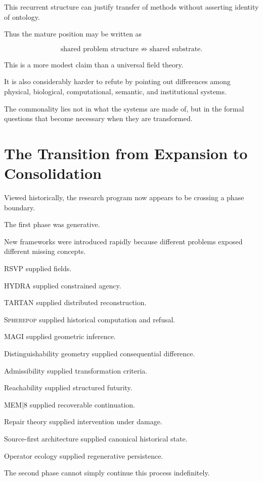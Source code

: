 \documentclass[11pt]{article}
\theoremstyle{remark}
\newcommand{\RSVP}{\textsc{RSVP}}
\newcommand{\HYDRA}{\textsc{HYDRA}}
\newcommand{\TARTAN}{\textsc{TARTAN}}
\newcommand{\MAGI}{\textsc{MAGI}}
\newcommand{\MEM}{\textsc{MEM|8}}
\newcommand{\Spherepop}{\textsc{Spherepop}}
\begin{document}
This recurrent structure can justify transfer of methods without asserting identity of ontology.

Thus the mature position may be written as

\begin{equation}
\boxed{
\text{shared problem structure}
\not\Rightarrow
\text{shared substrate}.
}
\end{equation}

This is a more modest claim than a universal field theory.

It is also considerably harder to refute by pointing out differences among physical, biological, computational, semantic, and institutional systems.

The commonality lies not in what the systems are made of, but in the formal questions that become necessary when they are transformed.

\section{The Transition from Expansion to Consolidation}

Viewed historically, the research program now appears to be crossing a phase boundary.

The first phase was generative.

New frameworks were introduced rapidly because different problems exposed different missing concepts.

\RSVP{} supplied fields.

\HYDRA{} supplied constrained agency.

\TARTAN{} supplied distributed reconstruction.

\Spherepop{} supplied historical computation and refusal.

\MAGI{} supplied geometric inference.

Distinguishability geometry supplied consequential difference.

Admissibility supplied transformation criteria.

Reachability supplied structured futurity.

\MEM{} supplied recoverable continuation.

Repair theory supplied intervention under damage.

Source-first architecture supplied canonical historical state.

Operator ecology supplied regenerative persistence.

The second phase cannot simply continue this process indefinitely.
\end{document}

